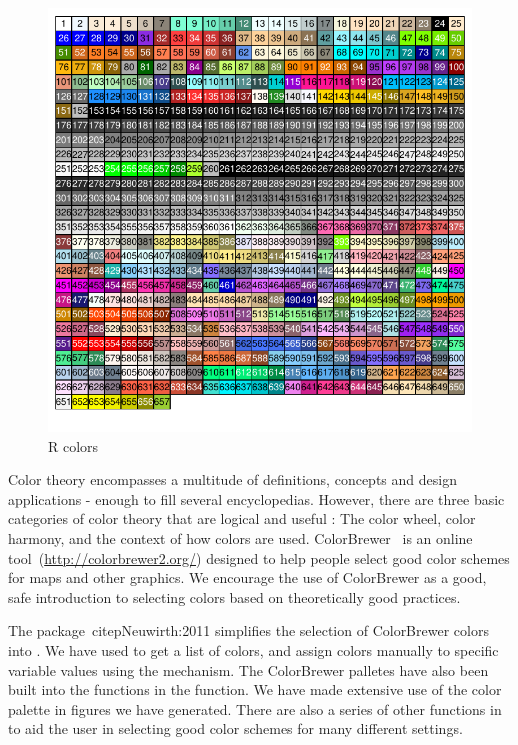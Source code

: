 \documentclass[nojss, letterpaper]{jss}\usepackage[]{graphicx}\usepackage[]{color}
\makeatletter
\def\maxwidth{ %
  \ifdim\Gin@nat@width>\linewidth
    \linewidth
  \else
    \Gin@nat@width
  \fi
}
\newenvironment{knitrout}{}{} %
\makeatother
\begin{document}
\begin{knitrout}\footnotesize
{}\color{fgcolor}\begin{figure}[htpb]


{\centering \includegraphics[width=\maxwidth]{figure/beamer-colorChart} 

}

\caption[R colors]{R colors\label{F:colorChart}}
\end{figure}


\end{knitrout}

Color theory encompasses a multitude of definitions, concepts and design applications - enough to fill several encyclopedias. However, there are three basic categories of color theory that are logical and useful : The color wheel, color harmony, and the context of how colors are used. ColorBrewer~\citep{Brewer:2003} is an online tool~(\url{http://colorbrewer2.org/}) designed to help people select good color schemes for maps and other graphics. We encourage the use of ColorBrewer as a good, safe introduction to selecting colors based on theoretically good practices. 

The  package~citep{Neuwirth:2011} simplifies the selection of ColorBrewer colors into . We have used  to get a list of colors, and assign colors manually to specific variable values using the   mechanism. The ColorBrewer palletes have also been built into the   functions in the  function. We have made extensive use of the  color palette in figures we have generated. There are also a series of other  functions in  to aid the user in selecting good color schemes for many different settings.
\end{document}
